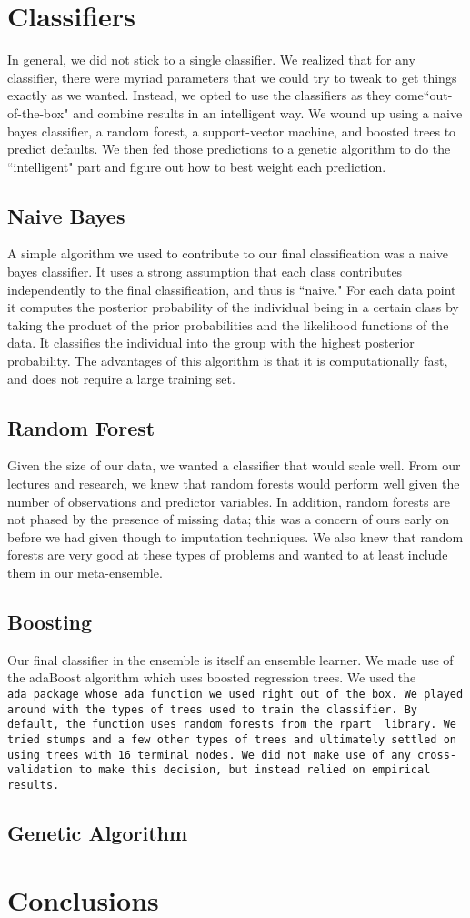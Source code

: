\documentclass[11pt, oneside]{article}   	%
\begin{document}
\section{Classifiers}
In general, we did not stick to a single classifier. We realized that for any classifier, there were myriad
parameters that we could try to tweak to get things exactly as we wanted. Instead, we 
opted to use the classifiers as they come``out-of-the-box" and combine results in an intelligent way. 
We wound up using a naive bayes classifier, a random forest, a support-vector machine, and 
boosted trees to predict defaults. We then fed those predictions to a genetic algorithm to do
the ``intelligent" part and figure out how to best weight each prediction.
	\subsection{Naive Bayes}
	A simple algorithm we used to contribute to our final classification was a naive bayes classifier. It uses a strong assumption that each class contributes independently to the final classification, and thus is ``naive." For each data point it computes the posterior probability of the individual being in a certain class by taking the product of the prior probabilities and the likelihood functions of the data. It classifies the individual into the group with the highest posterior probability. The advantages of this algorithm is that it is computationally fast, and does not require a large training set. 
	\subsection{Random Forest}
	Given the size of our data, we wanted a classifier that would scale well. From our lectures
	and research, we knew that random forests would perform well given the number of
	observations and predictor variables. In addition, random forests are not phased by the
	presence of missing data; this was a concern of ours early on before we had given though
	to imputation techniques. We also knew that random forests are very good at these
	types of problems and wanted to at least include them in our meta-ensemble.
	\subsection{Boosting}
	Our final classifier in the ensemble is itself an ensemble learner. We made use of the
	adaBoost algorithm which uses boosted regression trees. We used the \tt ada\rm~package
	whose \tt ada\rm~function we used right out of the box. We played around with the types of
	trees used to train the classifier. By default, the function uses random forests from the \tt rpart
	\rm~library. We tried stumps and a few other types of trees and ultimately settled
	on using trees with 16 terminal nodes. We did not make use of any cross-validation
	to make this decision, but instead relied on empirical results.
	\subsection{Genetic Algorithm}
\section{Conclusions}
\end{document}
